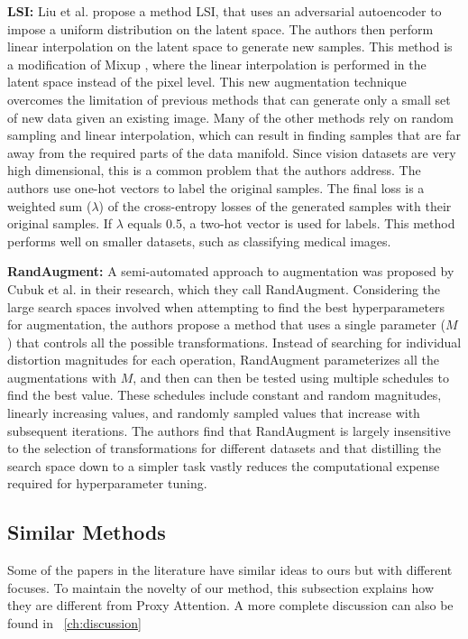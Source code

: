 \documentclass[a4paper,11pt,openright]{book}
\begin{document}
\textbf{LSI: }
Liu et al. \cite{liuDataAugmentationLatent2018} propose a method LSI, that uses an adversarial autoencoder to impose a uniform distribution on the latent space. The authors then perform linear interpolation on the latent space to generate new samples. This method is a modification of Mixup \cite{zhangMixupEmpiricalRisk2018}, where the linear interpolation is performed in the latent space instead of the pixel level. This new augmentation technique overcomes the limitation of previous methods that can generate only a small set of new data given an existing image. Many of the other methods rely on random sampling and linear interpolation, which can result in finding samples that are far away from the required parts of the data manifold. Since vision datasets are very high dimensional, this is a common problem that the authors address. The authors use one-hot vectors to label the original samples. The final loss is a weighted sum ($\lambda$) of the cross-entropy losses of the generated samples with their original samples. If $\lambda$ equals 0.5, a two-hot vector is used for labels. This method performs well on smaller datasets, such as classifying medical images.

\textbf{RandAugment: }
A semi-automated approach to augmentation was proposed by Cubuk et al. \cite{cubukRandaugmentPracticalAutomated2020} in their research, which they call RandAugment. Considering the large search spaces involved when attempting to find the best hyperparameters for augmentation, the authors propose a method that uses a single parameter ($M$) that controls all the possible transformations. Instead of searching for individual distortion magnitudes for each operation, RandAugment parameterizes all the augmentations with $M$, and then can then be tested using multiple schedules to find the best value. These schedules include constant and random magnitudes, linearly increasing values, and randomly sampled values that increase with subsequent iterations. The authors find that RandAugment is largely insensitive to the selection of transformations for different datasets and that distilling the search space down to a simpler task vastly reduces the computational expense required for hyperparameter tuning.


\subsection{Similar Methods}
Some of the papers in the literature have similar ideas to ours but with different focuses. To maintain the novelty of our method, this subsection explains how they are different from Proxy Attention. A more complete discussion can also be found in ~\ref{ch:discussion}
\end{document}
